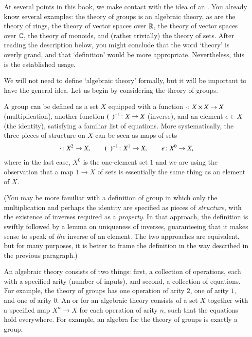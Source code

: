 \begin{remark}
\label{rmk:alg-thy}
At several points in this book, we make contact with the idea of an
.  You already know several examples: the theory of groups is an
algebraic theory, as are the theory of rings, the theory of vector spaces
over $\mathbb{R}$, the theory of vector spaces over $\mathbb{C}$, the theory of
monoids, and (rather trivially) the theory of sets.  After reading the
description below, you might conclude that the word `theory' is overly
grand, and that `definition' would be more appropriate.  Nevertheless, this
is the established usage.

We will not need to define `algebraic theory' formally, but it will be
important to have the general idea.  Let us begin by considering the theory
of groups.

A group can be defined as a set $X$ equipped with a function $\cdot \from X
\times X \to X$ (multiplication), another function $\blank^{-1}\from X \to
X$ (inverse), and an element $e \in X$ (the identity), satisfying a
familiar list of equations.  More systematically, the three pieces of
structure on $X$ can be seen as maps of sets
\[
\cdot\from X^2 \to X,
\qquad
\blank^{-1}\from X^1 \to X,
\qquad
e\from X^0 \to X,
\]
where in the last case, $X^0$ is the one-element set $1$ and we are using
the observation that a map $1 \to X$ of sets is essentially the same thing
as an element of $X$.

(You may be more familiar with a definition of group in which only the
multiplication and perhaps the identity are specified as pieces of
\emph{structure}, with the existence of inverses required as a
\emph{property}.  In that approach, the definition is swiftly followed by a
lemma on uniqueness of inverses, guaranteeing that it makes sense to speak
of \emph{the} inverse of an element.  The two approaches are equivalent,
but for many purposes, it is better to frame the definition in the way
described in the previous paragraph.)

An algebraic theory consists of two things: first, a collection of
operations, each with a specified arity%
%
%
(number of inputs), and second, a collection of equations.  For example,
the theory of groups has one operation of arity $2$, one of arity $1$, and
one of arity $0$.  An %
%
%
or %
%
%
for an algebraic theory consists of a set $X$ together with a specified map
$X^n \to X$ for each operation of arity $n$, such that the equations hold
everywhere.  For example, an algebra for the theory of groups is exactly a
group.


\end{remark}
